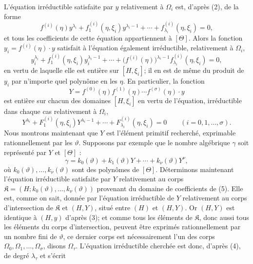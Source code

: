 L'équation irréductible satisfaite par $y$ relativement à $\Omega_i$ est, d'après (2), de la forme
\[
 f^{(i)}(\eta)y^{\lambda_i}+f_1^{(i)}(\eta,\xi_i)y^{\lambda_i-1}
+\cdots+f_{\lambda_i}^{(i)}(\eta,\xi_i)=0,
\]
et tous les coefficients de cette équation appartiennent à $[\Theta]$. Alors la fonction $y_i=f^{(i)}(\eta)\cdot y$ satisfait à l'équation également irréductible, relativement à $\Omega_i$,
\[
 y_i^{\lambda_i}+f_1^{(i)}(\eta,\xi_i)y_i^{\lambda_i-1}
+\cdots+\bigl(f^{(i)}(\eta)\bigr)^{\lambda_i-1}
 f_{\lambda_i}^{(i)}(\eta,\xi_i)=0,
\]
en vertu de laquelle elle est entière sur $[H,\xi_i]$; il en est de même du produit de $y_i$ par n'importe quel polynôme en les $\eta$. En particulier, la fonction
\begin{equation}
Y=f^{(0)}(\eta)f^{(1)}(\eta)\cdots f^{(\sigma)}(\eta)\cdot y
\tag{3}
\end{equation}
est entière sur chacun des domaines $[H,\xi_i]$ en vertu de l'équation, irréductible dans chaque cas relativement à $\Omega_i$,
\begin{equation}
Y^{\lambda_i}+F_1^{(i)}(\eta,\xi_i)Y^{\lambda_i-1}
+\cdots+F_{\lambda_i}^{(i)}(\eta,\xi_i)=0
\qquad (i=0,1,\ldots,\sigma).
\tag{4}
\end{equation}
Nous montrons maintenant que $Y$ est l'élément primitif recherché, exprimable rationnellement par les $\vartheta$. Supposons par exemple que le nombre algébrique $\gamma$ soit représenté par $Y$ et $[\Theta]$ :
\begin{equation}
\gamma=k_0(\vartheta)+k_1(\vartheta)Y+\cdots+k_\nu(\vartheta)Y^\nu,
\tag{5}
\end{equation}
où $k_0(\vartheta),\ldots,k_\nu(\vartheta)$ sont des polynômes de $[\Theta]$. Déterminons maintenant l'équation irréductible satisfaite par $Y$ relativement au corps $\mathfrak K=(H;k_0(\vartheta),\ldots,k_\nu(\vartheta))$ provenant du domaine de coefficients de (5). Elle est, comme on sait, donnée par l'équation irréductible de $Y$ relativement au corps d'intersection de $\mathfrak K$ et $(H,Y)$, situé entre $(H)$ et $(H,Y)$. Or $(H,Y)$ est identique à $(H,y)$ d'après (3); et comme tous les éléments de $\mathfrak K$, donc aussi tous les éléments du corps d'intersection, peuvent être exprimés rationnellement par un nombre fini de $\vartheta$, ce dernier corps est nécessairement l'un des corps $\Omega_0,\Omega_1,\ldots,\Omega_\sigma$, disons $\Omega_\tau$. L'équation irréductible cherchée est donc, d'après (4), de degré $\lambda_\tau$ et s'écrit
